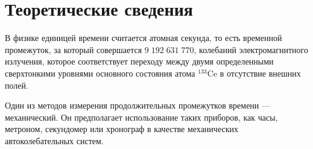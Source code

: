 \section{Теоретические сведения}

В физике единицей времени считается атомная секунда, то есть временной промежуток, за который совершается $9\;192\;631\;770$, колебаний электромагнитного излучения, которое соответствует переходу между двумя определенными сверхтонкими уровнями основного состояния атома $\mathrm{^{133}Ce}$ в отсутствие внешних полей.

Один из методов измерения продолжительных промежутков времени --- механический. Он предполагает использование таких приборов, как часы, метроном, секундомер или хронограф в качестве механических автоколебательных систем. 